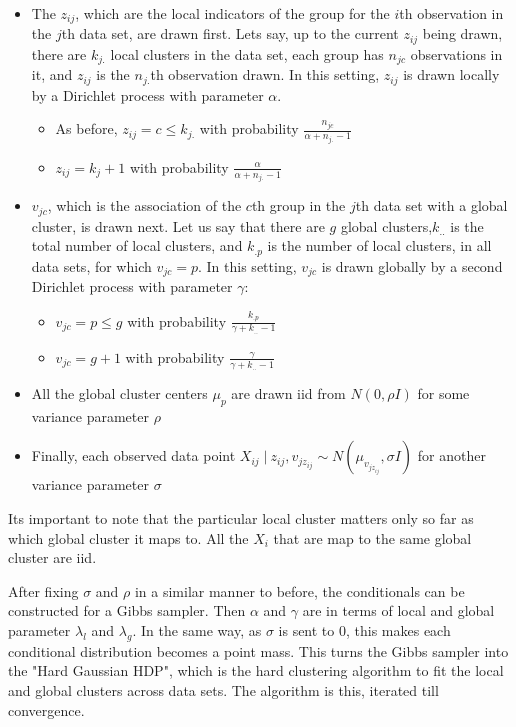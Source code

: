 \documentclass[11pt]{article}
\newcommand{\st}{ \; \big | \:}
\theoremstyle{definition}
\begin{document}
\begin{itemize}
    \item The $z_{ij}$, which are the local indicators of the group for the $i$th observation in the $j$th data set, are drawn first. Lets say, up to the current $z_{ij}$ being drawn, there are $k_{j.}$ local clusters in the data set, each group has $n_{jc}$ observations in it, and $z_{ij}$ is the $n_{j.}$th observation drawn. In this setting, $z_{ij}$ is drawn locally by a Dirichlet process with parameter $\alpha$. 
        \begin{itemize}
            \item As before, $z_{ij}=c\leq k_{j.}$ with probability $\frac{n_{jc}}{\alpha+n_{j.}-1}$
            \item $z_{ij}=k_j+1$ with probability $\frac{\alpha}{\alpha+n_{j.}-1}$
        \end{itemize}

    \item $v_{jc}$, which is the association of the $c$th group in the $j$th data set with a global cluster, is drawn next. Let us say that there are $g$ global clusters,$k_{..}$ is the total number of local clusters, and $k_{.p}$ is the number of local clusters, in all data sets, for which $v_{jc}=p$. In this setting, $v_{jc}$ is drawn globally by a second Dirichlet process with parameter $\gamma$:
        \begin{itemize}
            \item $v_{jc}=p\leq g$ with probability $\frac{k_{.p}}{\gamma+k_{..}-1}$
            \item $v_{jc}=g+1$ with probability $\frac{\gamma}{\gamma+k_{..}-1}$
        \end{itemize}
    \item All the global cluster centers $\mu_p$ are drawn iid from $N(0,\rho I)$ for some variance parameter $\rho$
    \item Finally, each observed data point $X_{ij}\st z_{ij},v_{jz_{ij}} \sim N(\mu_{v_{jz_{ij}}}, \sigma I)$ for another variance parameter $\sigma$
\end{itemize}
Its important to note that the particular local cluster matters only so far as which global cluster it maps to. All the $X_i$ that are map to the same global cluster are iid. \par
After fixing $\sigma$ and $\rho$ in a similar manner to before, the conditionals can be constructed for a Gibbs sampler. Then $\alpha$ and $\gamma$ are in terms of local and global parameter $\lambda_l$ and $\lambda_g$. In the same way, as $\sigma$ is sent to $0$, this makes each conditional distribution becomes a point mass. This turns the Gibbs sampler into the "Hard Gaussian HDP", which is the hard clustering algorithm to fit the local and global clusters across data sets. The algorithm is this, iterated till convergence.
\end{document}
